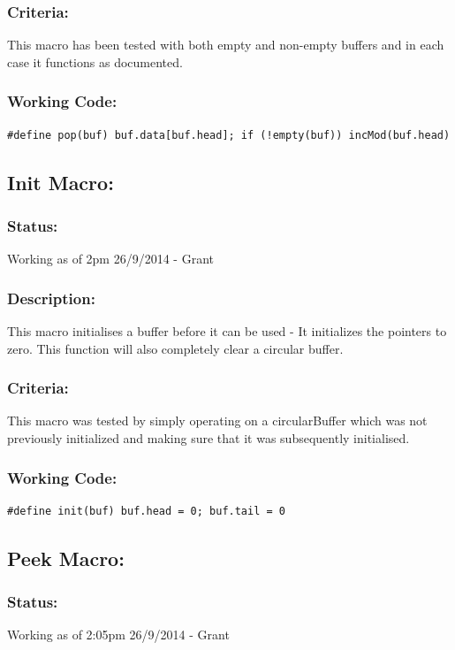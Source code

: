 \documentclass[]{report}
\begin{document}
\subsubsection{Criteria:}
This macro has been tested with both empty and non-empty buffers and in each case it functions as documented.

\subsubsection{Working Code:}
\begin{lstlisting}
#define pop(buf) buf.data[buf.head]; if (!empty(buf)) incMod(buf.head)
\end{lstlisting}

\subsection{Init Macro:}
\subsubsection{Status:}
Working as of 2pm 26/9/2014 - Grant

\subsubsection{Description:}
This macro initialises a buffer before it can be used - It initializes the pointers to zero. This function will also completely clear a circular buffer.

\subsubsection{Criteria:}
This macro was tested by simply operating on a circularBuffer which was not previously initialized and making sure that it was subsequently initialised.

\subsubsection{Working Code:}
\begin{lstlisting}
#define init(buf) buf.head = 0; buf.tail = 0
\end{lstlisting}

\subsection{Peek Macro:}
\subsubsection{Status:}
Working as of 2:05pm 26/9/2014 - Grant
\end{document}
